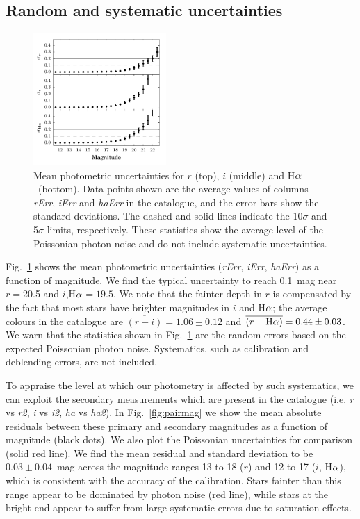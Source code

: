\documentclass[a4paper,useAMS,usenatbib]{mn2e}
\def\ha{\mbox{H$\rm \alpha$}}
\begin{document}
\subsection{Random and systematic uncertainties}
\label{sec:uncertainties}

\begin{figure}
    \includegraphics[width=0.45\textwidth]{figures/uncertainties/uncertainties.pdf} 
    \caption{Mean photometric uncertainties
             for $r$ (top), $i$ (middle) and \ha\ (bottom).
             Data points shown are the average values of
             columns \emph{rErr}, \emph{iErr} and \emph{haErr}
             in the catalogue,
             and the error-bars show the standard deviations.
             The dashed and solid lines indicate 
             the 10$\sigma$ and 5$\sigma$ limits, respectively.
             These statistics show the average level of the Poissonian
             photon noise and do not include systematic uncertainties.}
    \label{fig:uncertainties}
\end{figure}

Fig.~\ref{fig:uncertainties} shows the mean photometric
uncertainties (\emph{rErr}, \emph{iErr}, \emph{haErr})
as a function of magnitude.
We find the typical uncertainty to reach 0.1~mag near $r=$20.5 
and $i$,\ha$=19.5$.
We note that the fainter depth in $r$ is compensated
by the fact that most stars have brighter magnitudes in $i$ and \ha;
the average colours in the catalogue are
$\overline{(r-i)}=1.06\pm0.12$ and $\overline{(r-\ha)}=0.44\pm0.03$.
We warn that the statistics shown in Fig.~\ref{fig:uncertainties}
are the random errors based on the expected Poissonian photon noise.
Systematics, such as calibration and deblending errors,
are not included.

To appraise the level at which our photometry is affected by such systematics,
we can exploit the secondary measurements which are present in the catalogue
(i.e. \emph{r} vs \emph{r2}, \emph{i} vs \emph{i2}, \emph{ha} vs \emph{ha2}).
In Fig.~\ref{fig:pairmag} we show the mean absolute residuals between
these primary and secondary magnitudes as a function of magnitude (black dots).
We also plot the Poissonian uncertainties for comparison (solid red line).
We find the mean residual and standard deviation to be $0.03\pm0.04$~mag
across the magnitude ranges 13 to 18 ($r$)
and 12 to 17 ($i$, \ha),
which is consistent with the accuracy of the calibration.
Stars fainter than this range appear to be dominated by photon noise (red line),
while stars at the bright end appear to suffer from large systematic
errors due to saturation effects.
\end{document}
